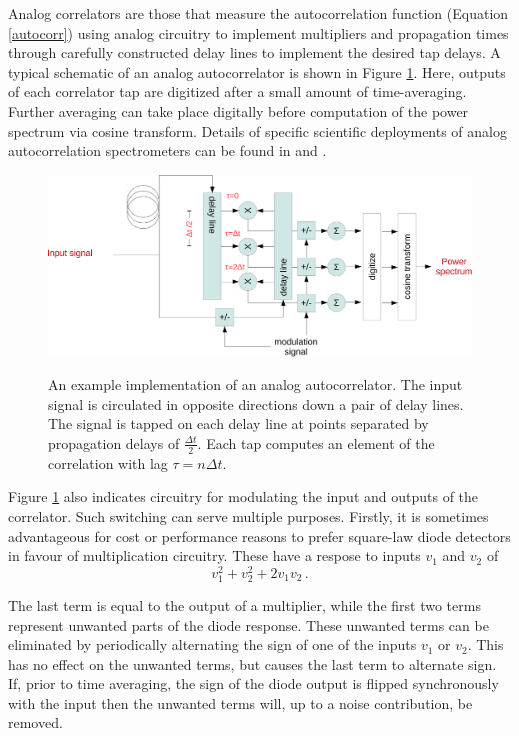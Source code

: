 \documentclass{article}
\begin{document}
Analog correlators are those that measure the autocorrelation function (Equation \ref{autocorr}) using analog circuitry to implement multipliers and propagation times through carefully constructed delay lines to implement the desired tap delays.
A typical schematic of an analog autocorrelator is shown in Figure \ref{fig:analog-autocorr}. Here, outputs of each correlator tap are digitized after a small amount of time-averaging. Further averaging can take place digitally before computation of the power spectrum via cosine transform. Details of specific scientific deployments of analog autocorrelation spectrometers can be found in \cite{Erickson2007} and \cite{Harris1998}.


\begin{figure}
 \centering
 \includegraphics[width=\textwidth]{./figures/analog-autocorr-crop.pdf}
 \label{fig:analog-autocorr}
 \caption{An example implementation of an analog autocorrelator. The input signal is circulated in opposite directions down a pair of delay lines. The signal is tapped on each delay line at points separated by propagation delays of $\frac{\Delta t}{2}$. Each tap computes an element of the correlation with lag $\tau=n\Delta t$.}
\end{figure}

Figure \ref{fig:analog-autocorr} also indicates circuitry for modulating the input and outputs of the correlator. Such switching can serve multiple purposes. Firstly, it is sometimes advantageous for cost or performance reasons to prefer square-law diode detectors in favour of multiplication circuitry. These have a respose to inputs $v_1$ and $v_2$ of
\begin{equation}
 v_1^2 + v_2^2 + 2v_1v_2 \, .
\end{equation}

The last term is equal to the output of a multiplier, while the first two terms represent unwanted parts of the diode response. These unwanted terms can be eliminated by periodically alternating the sign of one of the inputs $v_1$ or $v_2$. This has no effect on the unwanted terms, but causes the last term to alternate sign. If, prior to time averaging, the sign of the diode output is flipped synchronously with the input then the unwanted terms will, up to a noise contribution, be removed.
\end{document}
